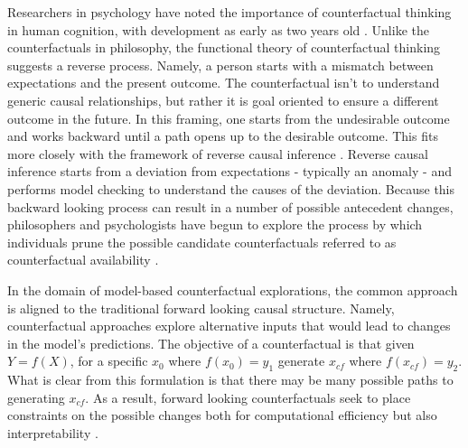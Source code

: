 \documentclass[letterpaper]{article} %
\begin{document}
Researchers in psychology have noted the importance of counterfactual thinking in human cognition, with development as early as two years old \cite{epstude2008functional}. Unlike the  counterfactuals in philosophy, the functional theory of counterfactual thinking suggests a reverse process. Namely, a person starts with a mismatch between expectations and the present outcome. The counterfactual isn't to understand generic causal relationships, but rather it is goal oriented to ensure a different outcome in the future. In this framing, one starts from the undesirable outcome and works backward until a path opens up to the desirable outcome. This fits more closely with the framework of reverse causal inference \cite{NBERw19614}.  Reverse causal inference starts from a deviation from expectations - typically an anomaly - and performs model checking to understand the causes of the deviation. Because this backward looking process can result in a number of possible antecedent changes, philosophers and psychologists have begun to explore the process by which individuals prune the possible candidate counterfactuals referred to as counterfactual availability \cite{Fazelpour2020}.

In the domain of model-based counterfactual explorations, the common approach is aligned to the traditional forward looking causal structure. Namely, counterfactual approaches explore alternative inputs that would lead to changes in the model's predictions. The objective of a counterfactual is that given $Y = f(X)$, for a specific $x_0$ where $f(x_0) = y_1$ generate $x_{cf}$ where $f(x_{cf}) = y_2$. What is clear from this formulation is that there may be many possible paths to generating $x_{cf}$. As a result, forward looking counterfactuals seek to place constraints on the possible changes both for computational efficiency but also interpretability \cite{wachter2017counterfactual}. 

\end{document}
